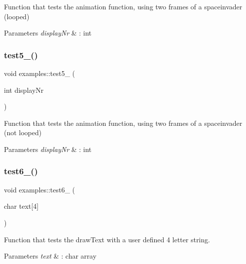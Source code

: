 Function that tests the animation function, using two frames of a spaceinvader (looped) 


\begin{DoxyParams}{Parameters}
{\em display\+Nr} & \+: int \\
\hline
\end{DoxyParams}
\mbox{\label{classexamples_a2951eb3130ebea1ef3d0f14fbf45f390}} 
\subsubsection{\texorpdfstring{test5\+\_()}{test5\_2()}}
{\footnotesize\ttfamily void examples\+::test5\+\_ (\begin{DoxyParamCaption}\item[{int}]{display\+Nr }\end{DoxyParamCaption})\hspace{0.3cm}{\ttfamily [inline]}}



Function that tests the animation function, using two frames of a spaceinvader (not looped) 


\begin{DoxyParams}{Parameters}
{\em display\+Nr} & \+: int \\
\hline
\end{DoxyParams}
\mbox{\label{classexamples_a4c4f7520f26e56fd26956c021ba6413a}} 
\subsubsection{\texorpdfstring{test6\+\_()}{test6\_1()}}
{\footnotesize\ttfamily void examples\+::test6\+\_ (\begin{DoxyParamCaption}\item[{char}]{text\mbox{[}4\mbox{]} }\end{DoxyParamCaption})\hspace{0.3cm}{\ttfamily [inline]}}



Function that tests the draw\+Text with a user defined 4 letter string. 


\begin{DoxyParams}{Parameters}
{\em text} & \+: char array \\
\hline
\end{DoxyParams}
\mbox{\label{classexamples_adea3697b47cb512e3355fc78fa522b91}} 
